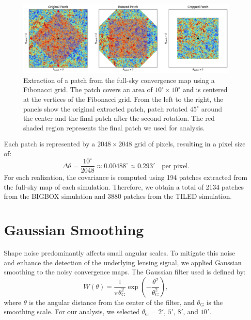 \begin{figure}
    \centering
    \includegraphics[width=\textwidth]{figures/fibonacci_extraction.png}
    \caption[Extraction of a patch from the full-sky convergence map using a Fibonacci grid]{Extraction of a patch from the full-sky convergence map using a Fibonacci grid. The patch covers an area of $10^\circ \times 10^\circ$ and is centered at the vertices of the Fibonacci grid. From the left to the right, the panels show the original extracted patch, patch rotated $45^\circ$ around the center and the final patch after the second rotation. The red shaded region represents the final patch we used for analysis.
    } \label{fig:fibonacci_extraction}
\end{figure}

Each patch is represented by a $2048 \times 2048$ grid of pixels, resulting in a pixel size of:
\begin{equation}
    \Delta \theta = \frac{10^\circ}{2048} \approx 0.00488^\circ \approx 0.293' \quad \text{per pixel}.
\end{equation}
For each realization, the covariance is computed using 194 patches extracted from the full-sky map of each simulation.
Therefore, we obtain a total of 2134 patches from the BIGBOX simulation and 3880 patches from the TILED simulation. 

\section{Gaussian Smoothing}
Shape noise predominantly affects small angular scales. To mitigate this noise and enhance the detection of the underlying lensing signal, we applied Gaussian smoothing to the noisy convergence maps. The Gaussian filter used is defined by:
\begin{equation}
    W(\theta) = \frac{1}{\pi \theta_{\mathrm{G}}^2} \exp\left( -\frac{\theta^2}{\theta_{\mathrm{G}}^2} \right),
\end{equation}
where $\theta$ is the angular distance from the center of the filter, and $\theta_{\mathrm{G}}$ is the smoothing scale. For our analysis, we selected $\theta_{\mathrm{G}} = 2'$, $5'$, $8'$, and $10'$.

